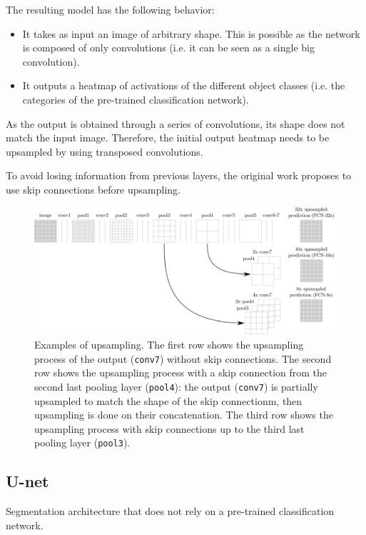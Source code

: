 The resulting model has the following behavior:
\begin{itemize}
    \item It takes as input an image of arbitrary shape. This is possible as the network is composed of only convolutions (i.e. it can be seen as a single big convolution).
    \item It outputs a heatmap of activations of the different object classes (i.e. the categories of the pre-trained classification network).
\end{itemize}

As the output is obtained through a series of convolutions, its shape does not match the input image.
Therefore, the initial output heatmap needs to be upsampled by using transposed convolutions.

To avoid losing information from previous layers, the original work proposes to use skip connections before upsampling.

\begin{figure}[H]
    \centering
    \includegraphics[width=0.95\linewidth]{./img/_convolutionalization_skip.pdf}
    \caption{
        Examples of upsampling.
        The first row shows the upsampling process of the output (\texttt{conv7}) without skip connections.
        The second row shows the upsampling process with a skip connection from the second last pooling layer (\texttt{pool4}):
        the output (\texttt{conv7}) is partially upsampled to match the shape of the skip connectionm, then upsampling is done on their concatenation.
        The third row shows the upsampling process with skip connections up to the third last pooling layer (\texttt{pool3}).
    }
\end{figure}


\subsection{U-net}

Segmentation architecture that does not rely on a pre-trained classification network.

